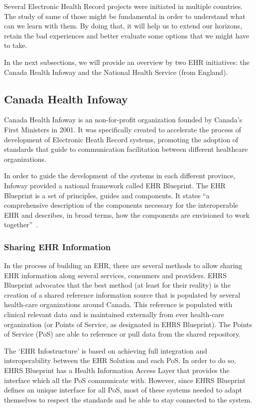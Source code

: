 Several Electronic Health Record projects were initiated in multiple countries. The study of same of those might be fundamental in order to understand what can we learn with them. By doing that, it will help us to extend our horizons, retain the bad experiences and better evaluate some options that we might have to take.

In the next subsections, we will provide an overview by two EHR initiatives: the Canada Health Infoway and the National Health Service (from England).

\subsection{Canada Health Infoway}

Canada Health Infoway is an non-for-profit organization founded by Canada's First Ministers in 2001. It was specifically created to accelerate the process of development of Electronic Heath Record systems, promoting the adoption of standards that guide to communication facilitation between different healthcare organizations. 

In order to guide the development of the systems in each different province, Infoway provided a national framework called EHR Blueprint. The EHR Blueprint is a set of principles, guides and components. It states ``a comprehensive description of the components necessary for the interoperable EHR and describes, in broad terms, how the components are envisioned to work together''~\citep{April2006}.

\subsubsection{Sharing EHR Information} \label{sec:share-ehri}
In the process of building an EHR, there are several methods to allow sharing EHR information along several services, consumers and providers. EHRS Blueprint advocates that the best method (at least for their reality) is the creation of a shared reference information source that is populated by several health-care organizations around Canada. This reference is populated with clinical relevant data and is maintained externally from ever health-care organization (or Points of Service, as designated in EHRS Blueprint). The Points of Service (PoS) are able to reference or pull data from the shared repository.

The `EHR Infostructure' is based on achieving full integration and interoperability between the EHR Solution and each PoS. In order to do so, EHRS Blueprint has a Health Information Access Layer that provides the interface which all the PoS communicate with. However, since EHRS Blueprint defines an unique interface for all PoS, most of these systems needed to adapt themselves to respect the standards and be able to stay connected to the system. 

